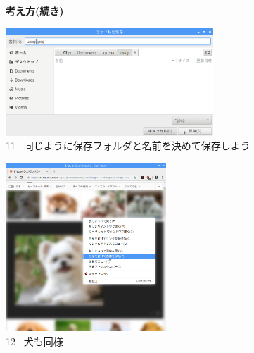 \documentclass[a4paper,12pt]{jarticle}
\begin{document}
\begin{figure}[t]
  \textbf{考え方(続き)}



  \centering
  \begin{minipage}{\textwidth}
    \begin{minipage}{7.882cm}
      \includegraphics[width=7.811cm]{textbook-img103.png}\\
      11 \ 同じように保存フォルダと名前を決めて保存しよう
    \end{minipage}
    \begin{minipage}{2.582cm}
    \end{minipage}
    \begin{minipage}{6.257cm}
      \includegraphics[width=6.041cm]{textbook-img092.png}\\
      12 \ 犬も同様
    \end{minipage}
  \end{minipage}


  \bigskip



\end{figure}
\end{document}
